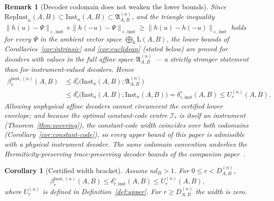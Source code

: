 \documentclass[11pt,a4paper]{article}
\newtheorem{corollary}[theorem]{Corollary}
\newtheorem{remark}[theorem]{Remark}
\newcommand{\Lin}{\mathrm{L}}
\newcommand{\Inst}{\mathrm{Inst}}
\newcommand{\RepInst}{\mathrm{RepInst}}
\begin{document}
\begin{remark}[Decoder codomain does not weaken the lower bounds]
\label{rem:decoder-codomain}
Since $\RepInst_n(A,B)\subset\Inst_n(A,B)\subset\mathfrak A_{A,B}^{(n)}$, and the triangle inequality $\|h(u)-\Psi\|_{\diamond,\mathrm{inst}}+\|h(-u)-\Psi\|_{\diamond,\mathrm{inst}}\ge\|h(u)-h(-u)\|_{\diamond,\mathrm{inst}}$ holds for every $\Psi$ in the ambient vector space $\bigoplus_k\Lin(A,B)$, the lower bounds of Corollaries~\ref{cor:intrinsic} and \ref{cor:euclidean} (stated below) are proved for decoders with values in the full affine space $\mathfrak A_{A,B}^{(n)}$ --- a strictly stronger statement than for instrument-valued decoders. Hence
\begin{align*}
\beta_r^{\mathrm{best},(n)}(A,B)
&\le\delta_r^{\mathrm c}\big(\Inst_n(A,B);\mathfrak A_{A,B}^{(n)}\big)\\
&\le\delta_r^{\mathrm c}\big(\Inst_n(A,B);\Inst_n(A,B)\big)
=\delta_{r,\mathrm{inst}}^{\diamond}(A,B)
\le U_r^{(n)}(A,B).
\end{align*}
Allowing unphysical affine decoders cannot circumvent the certified lower envelope; and because the optimal constant-code centre $\mathcal I_*$ is itself an instrument (Theorem~\ref{thm:covering}), the constant-code width coincides over both codomains (Corollary~\ref{cor:constant-code}), so every upper bound of this paper is admissible with a physical instrument decoder. The same codomain convention underlies the Hermiticity-preserving trace-preserving decoder bounds of the companion paper~\cite{CompanionChannels}.
\end{remark}

\begin{corollary}[Certified width bracket]
\label{cor:bracket}
Assume $nd_B>1$. For $0\le r<D_{A,B}^{(n)}$,
\[
\beta_r^{\mathrm{best},(n)}(A,B)
\le\delta_{r,\mathrm{inst}}^{\diamond}(A,B)
\le U_r^{(n)}(A,B),
\]
where $U_r^{(n)}$ is defined in Definition~\ref{def:upper}. For $r\ge D_{A,B}^{(n)}$ the width is zero.
\end{corollary}
\end{document}
